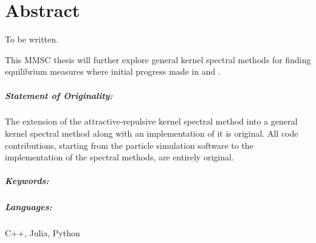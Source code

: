 \chapter*{Abstract}
\label{chap:abstract}
To be written.

This MMSC thesis will further explore general kernel spectral methods for finding equilibrium measures where initial progress made in \cite{2020-power-law-kernels} and \cite{2021-arbitrary-dimensions}.

\paragraph{Statement of Originality:}
The extension of the attractive-repulsive kernel spectral method into a general kernel spectral method along with an implementation of it is original.
All code contributions, starting from the particle simulation software to the implementation of the spectral methods, are entirely original.

\paragraph{Keywords:}
\thesiskeywords

\paragraph{Languages:}
C++, Julia, Python
